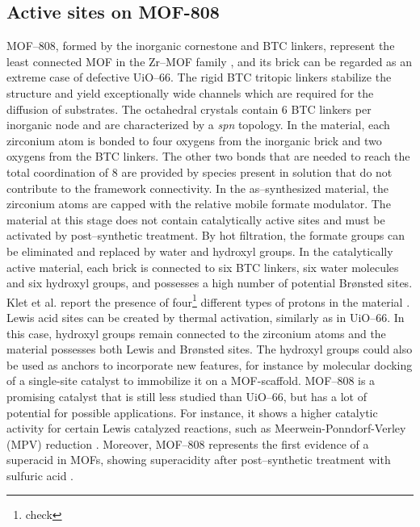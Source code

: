 \subsection{Active sites on MOF-808}
MOF--808, formed by the inorganic  cornestone and BTC linkers, represent the least connected MOF in the Zr--MOF family \cite{furukawa2014water}, and its brick can be regarded as an extreme case of defective UiO--66. The rigid BTC tritopic linkers stabilize the structure and yield exceptionally wide channels which are required for the diffusion of substrates. The octahedral crystals contain 6 BTC linkers per inorganic node and are characterized by a \textit{spn} topology. 
In the material, each zirconium atom is bonded to four oxygens from the inorganic brick and two oxygens from the BTC linkers. The other two bonds that are needed to reach the total coordination of 8 are provided by species present in solution that do not contribute to the framework connectivity. In the as--synthesized material, the zirconium atoms are capped with the relative mobile formate modulator. 
The material at this stage does not contain catalytically active sites and must be activated by post--synthetic treatment. By hot filtration, the formate groups can be eliminated and replaced by water and hydroxyl groups. In the catalytically active material, each brick is connected to six BTC linkers, six water molecules and six hydroxyl groups, and possesses a high number of potential Br\o{}nsted sites. Klet et al. report the presence of four\footnote{check} different types of protons in the material \cite{klet2016evaluation}. Lewis acid sites can be created by thermal activation, similarly as in UiO--66. In this case, hydroxyl groups remain connected to the zirconium atoms and the material possesses both Lewis and Br\o{}nsted sites. The hydroxyl groups could also be used as anchors to incorporate new features, for instance by molecular docking of a single-site catalyst to immobilize it on a MOF-scaffold. MOF--808 is a promising catalyst that is still less studied than UiO--66, but has a lot of potential for possible applications. For instance, it shows a higher catalytic activity for certain Lewis catalyzed reactions, such as Meerwein-Ponndorf-Verley (MPV) reduction \cite{plessers2016zr, mautschke2018catalytic}. 
Moreover, MOF--808 represents the first evidence of a superacid in MOFs, showing superacidity after post--synthetic treatment with sulfuric acid \cite{jiang2014superacidity}.

